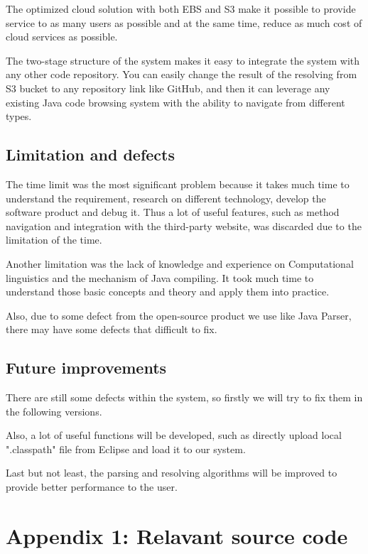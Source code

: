 \documentclass[runningheads]{llncs}
\begin{document}
The optimized cloud solution with both EBS and S3 make it possible to provide service to as many users as possible and at the same time, reduce as much cost of cloud services as possible.

The two-stage structure of the system makes it easy to integrate the system with any other code repository. You can easily change the result of the resolving from S3 bucket to any repository link like GitHub, and then it can leverage any existing Java code browsing system with the ability to navigate from different types.

\subsection{Limitation and defects}
The time limit was the most significant problem because it takes much time to understand the requirement, research on different technology, develop the software product and debug it. Thus a lot of useful features, such as method navigation and integration with the third-party website, was discarded due to the limitation of the time.

Another limitation was the lack of knowledge and experience on Computational linguistics and the mechanism of Java compiling. It took much time to understand those basic concepts and theory and apply them into practice.

Also, due to some defect from the open-source product we use like Java Parser, there may have some defects that difficult to fix. 

\subsection{Future improvements}
There are still some defects within the system, so firstly we will try to fix them in the following versions.

Also, a lot of useful functions will be developed, such as directly upload local ".classpath" file from Eclipse and load it to our system.

Last but not least, the parsing and resolving algorithms will be improved to provide better performance to the user.


\newpage



\newpage
\section*{Appendix 1: Relavant source code }
\end{document}
